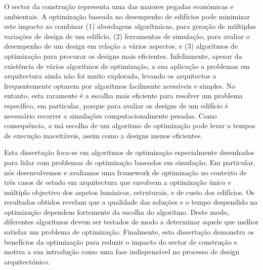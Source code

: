 \noindent 
O sector da construção representa uma das maiores pegadas económicas e ambientais. A optimização baseada no desempenho de edifícios pode minimizar este impacto ao combinar (1) abordagens algorítmicas, para geração de múltiplas variações de design de um edifício, (2) ferramentas de simulação, para avaliar o desempenho de um design em relação a vários aspectos, e (3) algoritmos de optimização para procurar os designs mais eficientes. Infelizmente, apesar da existência de vários algoritmos de optimização, a sua aplicação a problemas em arquitectura ainda não foi muito explorada, levando os arquitectos a frequentemente optarem por algoritmos facilmente acessíveis e simples. No entanto, esta raramente é a escolha mais eficiente para resolver um problema específico, em particular, porque para avaliar os designs de um edifício é necessário recorrer a simulações computacionalmente pesadas. Como consequência, a má escolha de um algoritmo de optimização pode levar a tempos de execução inaceitáveis, assim como a designs menos eficientes.

Esta dissertação foca-se em algoritmos de optimização especialmente desenhados para lidar com problemas de optimização baseados em simulação. Em particular, nós desenvolvemos e avaliamos uma framework de optimização no contexto de três casos de estudo em arquitectura que envolvem a optimização único e múltiplo objectivo dos aspetos lumínicos, estruturais, e de custo dos edifícios. Os resultados obtidos revelam que a qualidade das soluções e o tempo despendido na optimização dependem fortemente da escolha do algoritmo. Deste modo, diferentes algoritmos devem ser testados de modo a determinar aquele que melhor satisfaz um problema de optimização. Finalmente, esta dissertação demonstra os benefícios da optimização para reduzir o impacto do sector de construção e motiva a sua introdução como uma fase indispensável no processo de design arquitectónico.

